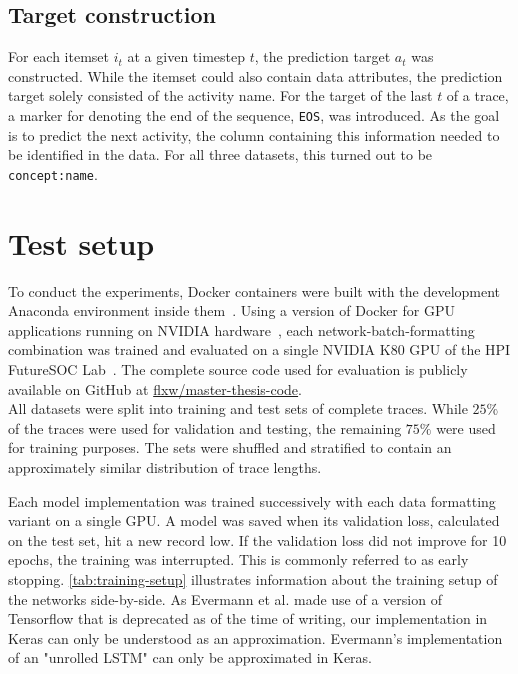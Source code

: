 \subsection*{Target construction}
For each itemset $i_t$ at a given timestep $t$, the prediction target $a_t$ was constructed. While the itemset could also contain data attributes, the prediction target solely consisted of the activity name. For the target of the last $t$ of a trace, a marker for denoting the end of the sequence, \verb=EOS=, was introduced.
As the goal is to predict the next activity, the column containing this information needed to be identified in the data. For all three datasets, this turned out to be \verb=concept:name=.

\section{Test setup}
\label{sec:eval:test-setup}
To conduct the experiments, Docker containers were built with the development Anaconda environment inside them~\cite{web:docker}. Using a version of Docker for GPU applications running on NVIDIA hardware~\cite{web:nvidia-docker}, each network-batch-formatting combination was trained and evaluated on a single NVIDIA K80 GPU of the HPI FutureSOC Lab~\cite{web:fsoc}. The complete source code used for evaluation is publicly available on GitHub at \href{https://github.com/flxw/master-thesis-code}{flxw/master-thesis-code}.\\

All datasets were split into training and test sets of complete traces. While $25\%$ of the traces were used for validation and testing, the remaining $75\%$ were used for training purposes. The sets were shuffled and stratified to contain an approximately similar distribution of trace lengths.

Each model implementation was trained successively with each data formatting variant on a single GPU. A model was saved when its validation loss, calculated on the test set, hit a new record low. If the validation loss did not improve for 10 epochs, the training was interrupted. This is commonly referred to as early stopping. \autoref{tab:training-setup} illustrates information about the training setup of the networks side-by-side. As Evermann et al. made use of a version of Tensorflow that is deprecated as of the time of writing, our implementation in Keras can only be understood as an approximation. Evermann's implementation of an "unrolled LSTM" can only be approximated in Keras.


